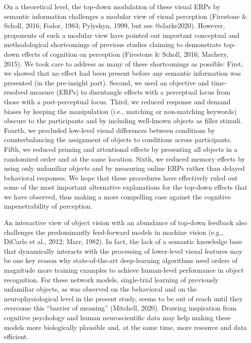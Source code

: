 \documentclass[
  english,
  man,floatsintext]{apa7}
\begin{document}
On a theoretical level, the top-down modulation of these visual ERPs by semantic information challenges a modular view of visual perception (Firestone \& Scholl, 2016; Fodor, 1983; Pylyshyn, 1999, but see @clarke2020). However, proponents of such a modular view have pointed out important conceptual and methodological shortcomings of previous studies claiming to demonstrate top-down effects of cognition on perception (Firestone \& Scholl, 2016; Machery, 2015). We took care to address as many of these shortcomings as possible: First, we showed that no effect had been present before any semantic information was presented (in the pre-insight part). Second, we used an objective and time-resolved measure (ERPs) to disentangle effects with a perceptual locus from those with a post-perceptual locus. Third, we reduced response and demand biases by keeping the manipulation (i.e., matching or non-matching keywords) obscure to the participants and by including well-known objects as filler stimuli. Fourth, we precluded low-level visual differences between conditions by counterbalancing the assignment of objects to conditions across participants. Fifth, we reduced priming and attentional effects by presenting all objects in a randomized order and at the same location. Sixth, we reduced memory effects by using only unfamiliar objects and by measuring online ERPs rather than delayed behavioral responses. We hope that these procedures have effectively ruled out some of the most important alternative explanations for the top-down effects that we have observed, thus making a more compelling case against the cognitive impenetrability of perception.

An interactive view of object vision with an abundance of top-down feedback also challenges the predominantly feed-forward models in machine vision (e.g., DiCarlo et al., 2012; Marr, 1982). In fact, the lack of a semantic knowledge base that dynamically interacts with the processing of lower-level visual features may be one key reason why state-of-the-art deep-learning algorithms need orders of magnitude more training examples to achieve human-level performance in object recognition. For these network models, single-trial learning of previously unfamiliar objects, as was observed on the behavioral and on the neurophysiological level in the present study, seems to be out of reach until they overcome this \enquote{barrier of meaning} (Mitchell, 2020). Drawing inspiration from cognitive psychology and human neuroscientific data may help making these models more biologically plausible and, at the same time, more resource and data efficient.
\end{document}

